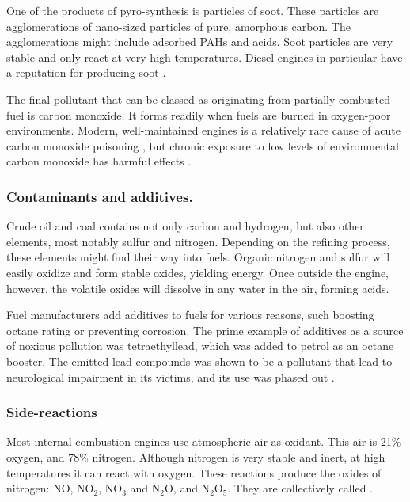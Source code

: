 One of the products of pyro-synthesis is particles of soot. These particles are
agglomerations of nano-sized particles of pure, amorphous carbon. The
agglomerations might include adsorbed PAHs and acids. Soot particles are very
stable and only react at very high temperatures. Diesel engines in particular
have a reputation for producing soot \autocite{Mohankumar2017}.

The final pollutant that can be classed as originating from partially combusted
fuel is carbon monoxide. It forms readily when fuels are burned in oxygen-poor
environments. Modern, well-maintained engines is a relatively rare cause of
acute carbon monoxide poisoning \autocite{Reumuth2018}, but chronic exposure to
low levels of environmental carbon monoxide has harmful effects
\autocite{Wright2002}.

\subsubsection{Contaminants and additives.}

Crude oil and coal contains not only carbon and hydrogen, but also other
elements, most notably sulfur and nitrogen. Depending on the refining process,
these elements might find their way into fuels. Organic nitrogen and sulfur will
easily oxidize and form stable oxides, yielding energy. Once outside the engine,
however, the volatile oxides will dissolve in any water in the air, forming
acids. \autocite{Duncan2016}

Fuel manufacturers add additives to fuels for various reasons, such boosting
octane rating or preventing corrosion. The prime example of additives as a
source of noxious pollution was tetraethyllead, which was added to petrol as an
octane booster. The emitted lead compounds was shown to be a pollutant that lead
to neurological impairment in its victims, and its use was phased out
\autocite{Needleman2000}.

\subsubsection{Side-reactions}

Most internal combustion engines use atmospheric air as oxidant. This air is
21\% oxygen, and 78\% nitrogen. Although nitrogen is very stable and inert, at
high temperatures it can react with oxygen. These reactions produce the oxides
of nitrogen: NO, NO$_2$, NO$_3$ and N$_2$O, and N$_2$O$_5$. They are
collectively called \nox.

